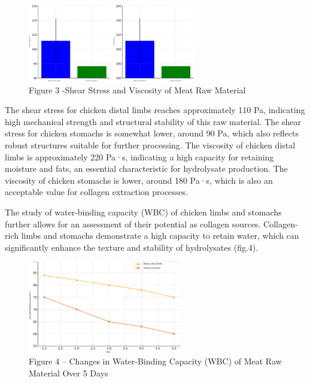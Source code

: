 \begin{figure}[H]
	\centering
	\includegraphics[width=0.65\textwidth]{media/pish/image11}
	\caption*{Figure 3 -Shear Stress and Viscosity of Meat Raw Material}
\end{figure}

\begin{multicols}{2}
The shear stress for chicken distal limbs reaches approximately 110 Pa,
indicating high mechanical strength and structural stability of this raw
material. The shear stress for chicken stomachs is somewhat lower,
around 90 Pa, which also reflects robust structures suitable for further
processing. The viscosity of chicken distal limbs is approximately 220
Pa·s, indicating a high capacity for retaining moisture and fats, an
essential characteristic for hydrolysate production. The viscosity of
chicken stomachs is lower, around 180 Pa·s, which is also an acceptable
value for collagen extraction processes.

The study of water-binding capacity (WBC) of chicken limbs and stomachs
further allows for an assessment of their potential as collagen sources.
Collagen-rich limbs and stomachs demonstrate a high capacity to retain
water, which can significantly enhance the texture and stability of
hydrolysates (fig.4).
\end{multicols}

\begin{figure}[H]
	\centering
	\includegraphics[width=0.6\textwidth]{media/pish/image12}
	\caption*{Figure 4 -- Changes in Water-Binding Capacity (WBC) of Meat Raw
Material Over 5 Days}
\end{figure}

